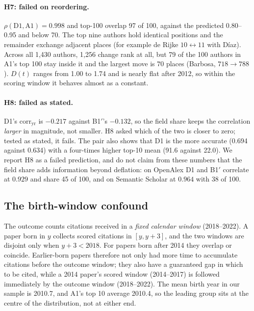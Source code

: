 \documentclass{article}
\begin{document}
\paragraph{H7: failed on reordering.} $\rho(\text{D1}, \text{A1}) = 0.998$ and top-100 overlap 97
of 100, against the predicted 0.80--0.95 and below 70. The top nine authors hold identical
positions and the remainder exchange adjacent places (for example de Rijke $10 \leftrightarrow 11$
with D\'iaz). Across all 1,430 authors, 1,256 change rank at all, but 79 of the 100 authors in A1's
top 100 stay inside it and the largest move is $70$ places (Barbosa, $718 \to 788$). $D(t)$ ranges
from 1.00 to 1.74 and is nearly flat after 2012, so within the scoring window it behaves almost as
a constant.

\paragraph{H8: failed as stated.} D1's $\text{corr}_{\text{yr}}$ is $-0.217$ against B1$'$'s
$-0.132$, so the field share keeps the correlation \emph{larger} in magnitude, not smaller. H8
asked which of the two is closer to zero; tested as stated, it fails. The pair also shows that D1
is the more accurate (0.694 against 0.634) with a four-times higher top-10 mean (91.6 against
22.0). We report H8 as a failed prediction, and do not claim from these numbers that the field
share adds information beyond deflation: on OpenAlex D1 and B1$'$ correlate at $0.929$ and share
45 of 100, and on Semantic Scholar at $0.964$ with 38 of 100.

\subsection{The birth-window confound}
\label{sec:confound}

The outcome counts citations received in a \emph{fixed calendar window} (2018--2022). A paper born
in $y$ collects scored citations in $[y, y+3]$, and the two windows are disjoint only when
$y + 3 < 2018$. For papers born after 2014 they overlap or coincide. Earlier-born papers therefore
not only had more time to accumulate citations before the outcome window; they also have a
guaranteed gap in which to be cited, while a 2014 paper's scored window (2014--2017) is followed
immediately by the outcome window (2018--2022). The mean birth year in our sample is 2010.7, and
A1's top 10 average 2010.4, so the leading group sits at the centre of the distribution, not at
either end.
\end{document}
